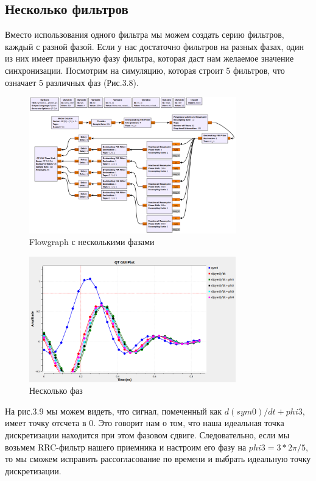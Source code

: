 \documentclass[a4paper,12pt]{report}
\begin{document}
\subsection{Несколько фильтров} 
    Вместо использования одного фильтра мы можем создать серию фильтров, каждый с разной фазой. Если у нас достаточно фильтров на разных фазах, один из них имеет правильную фазу фильтра, которая даст нам желаемое значение синхронизации. Посмотрим на симуляцию, которая строит 5 фильтров, что означает 5 различных фаз (Рис.3.8).
\begin{figure}[H]
        \centering
        \includegraphics[width=0.8\textwidth]{fig3-8.PNG}
        \caption{Flowgraph с несколькими фазами}
        \label{fig:fig3-8}
\end{figure}
\begin{figure}[H]
        \centering
        \includegraphics[width=0.8\textwidth]{fig3-9.PNG}
        \caption{Несколько фаз}
        \label{fig:fig3-9}
\end{figure} 
   
    На рис.3.9 мы можем видеть, что сигнал, помеченный как $d(sym0)/dt+phi3$, имеет точку отсчета в 0. Это говорит нам о том, что наша идеальная точка дискретизации находится при этом фазовом сдвиге. Следовательно, если мы возьмем RRC-фильтр нашего приемника и настроим его фазу на $phi3=3*2\pi/5$, то мы сможем исправить рассогласование по времени и выбрать идеальную точку дискретизации.
    
\end{document}
